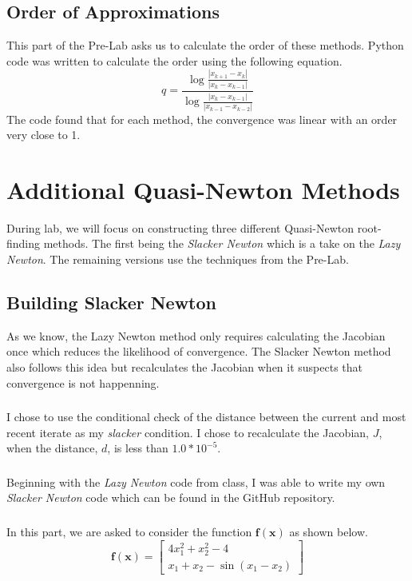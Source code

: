 \documentclass{article}
\begin{document}
\subsection{Order of Approximations}
This part of the Pre-Lab asks us to calculate the order of these methods. Python code was written to calculate the order using the following equation.
\[
q=\frac{\log{\frac{|x_{k+1}-x_k|}{|x_k-x_{k-1}|}}}{\log{\frac{|x_k-x_{k-1}|}{|x_{k-1}-x_{k-2}|}}}
\]
The code found that for each method, the convergence was linear with an order very close to 1.

\section{Additional Quasi-Newton Methods}
During lab, we will focus on constructing three different Quasi-Newton root-finding methods. The first being the \textit{Slacker Newton} which is a take on the \textit{Lazy Newton}. The remaining versions use the techniques from the Pre-Lab.

\subsection{Building Slacker Newton}
As we know, the Lazy Newton method only requires calculating the Jacobian once which reduces the likelihood of convergence. The Slacker Newton method also follows this idea but recalculates the Jacobian when it suspects that convergence is not happenning.

\subsubsection{}
I chose to use the conditional check of the distance between the current and most recent iterate as my \textit{slacker} condition. I chose to recalculate the Jacobian, \(J\), when the distance, \(d\), is less than \(1.0*10^{-5}\).

\subsubsection{}
Beginning with the \textit{Lazy Newton} code from class, I was able to write my own \textit{Slacker Newton} code which can be found in the GitHub repository.

\subsubsection{}
In this part, we are asked to consider the function \(\mathbf{f(x)}\) as shown below.
\[
\mathbf{f(x)} =
\begin{bmatrix}
    4x_1^2+x_2^2-4 \\
    x_1+x_2-\sin{(x_1-x_2)}
\end{bmatrix}
\]
\end{document}
